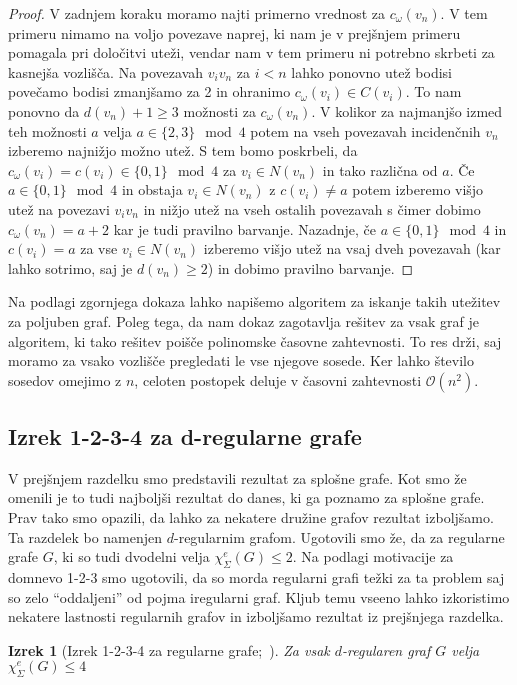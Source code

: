 \documentclass[12pt,a4paper,twoside]{article}
\theoremstyle{definition} %
\theoremstyle{plain} %
\newtheorem{izrek}[definicija]{Izrek}
\newcommand{\ec}{\chi_{\Sigma}^e}
\numberwithin{equation}{section}  %
\begin{document}
\begin{proof}
V zadnjem koraku moramo najti primerno vrednost za $c_{\omega}(v_n)$. V tem primeru nimamo na voljo povezave naprej, ki nam je v prejšnjem primeru pomagala pri določitvi uteži, vendar nam v tem primeru ni potrebno skrbeti za kasnejša vozlišča. Na povezavah $v_iv_n$ za $i < n$ lahko ponovno utež bodisi povečamo bodisi zmanjšamo za 2 in ohranimo $c_{\omega}(v_i) \in C(v_i)$. To nam ponovno da $d(v_n) + 1 \ge 3$ možnosti za $c_{\omega}(v_n)$. V kolikor za najmanjšo izmed teh možnosti $a$ velja $a \in \{2,3\} \mod 4$ potem na vseh povezavah incidenčnih $v_n$ izberemo najnižjo možno utež. S tem bomo poskrbeli, da $c_{\omega}(v_i) = c(v_i) \in \{0,1\} \mod 4$ za $v_i \in N(v_n)$ in tako različna od $a$. Če $a \in \{0,1\} \mod 4$ in obstaja $v_i \in N(v_n)$ z $c(v_i) \neq a$ potem izberemo višjo utež na povezavi $v_iv_n$ in nižjo utež na vseh ostalih povezavah s čimer dobimo $c_{\omega}(v_n) = a + 2$ kar je tudi pravilno barvanje. Nazadnje, če $a \in \{0, 1\} \mod 4$ in $c(v_i) = a$ za vse $v_i \in N(v_n)$ izberemo višjo utež na vsaj dveh povezavah (kar lahko sotrimo, saj je $d(v_n) \ge 2$) in dobimo pravilno barvanje.
\end{proof}

Na podlagi zgornjega dokaza lahko napišemo algoritem za iskanje takih utežitev za poljuben graf. Poleg tega, da nam dokaz zagotavlja rešitev za vsak graf je algoritem, ki tako rešitev poišče polinomske časovne zahtevnosti. To res drži, saj moramo za vsako vozlišče pregledati le vse njegove sosede. Ker lahko število sosedov omejimo z $n$, celoten postopek deluje v časovni zahtevnosti $\mathcal{O}(n^2)$.

\subsection{Izrek 1-2-3-4 za d-regularne grafe}

V prejšnjem razdelku smo predstavili rezultat za splošne grafe. Kot smo že omenili je to tudi najboljši rezultat do danes, ki ga poznamo za splošne grafe. Prav tako smo opazili, da lahko za nekatere družine grafov rezultat izboljšamo. Ta razdelek bo namenjen $d$-regularnim grafom. Ugotovili smo že, da za regularne grafe $G$, ki so tudi dvodelni velja $\ec(G) \le 2$. Na podlagi motivacije za domnevo 1-2-3 smo ugotovili, da so morda regularni grafi težki za ta problem saj so zelo ``oddaljeni''  od pojma iregularni graf. Kljub temu vseeno lahko izkoristimo nekatere lastnosti regularnih grafov in izboljšamo rezultat iz prejšnjega razdelka.
\begin{izrek}[Izrek 1-2-3-4 za regularne grafe;~\citet{regular}]
\label{regular_4}
Za vsak $d$-regularen graf $G$ velja $\ec(G) \le 4$
\end{izrek}
\end{document}
